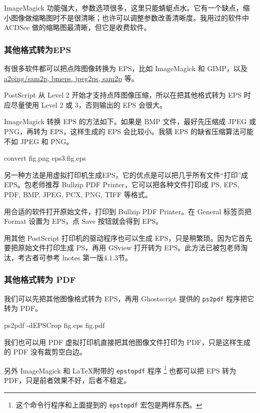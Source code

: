 ImageMagick 功能强大，参数选项很多，这里只能蜻蜓点水。它有一个缺点，缩小图像做缩略图时不是很清晰；也许可以调整参数改善清晰度。我用过的软件中 ACDSee 做的缩略图最清晰，但它是收费软件。

\subsubsection{其他格式转为EPS}

有很多软件都可以把点阵图像转换为 EPS，比如 ImageMagick 和 GIMP，以及 \href{https://texfaq.org/FAQ-dvipsgraphics}{a2ping/sam2p, bmeps, jpeg2ps, sam2p} 等。

PostScript 从 Level 2 开始才支持点阵图像压缩，所以在把其他格式转为 EPS 时应尽量使用 Level 2 或 3，否则输出的 EPS 会很大。

ImageMagick 转换 EPS 的方法如下。如果是 BMP 文件，最好先压缩成 JPEG 或 PNG，再转为 EPS，这样生成的 EPS 会比较小。我猜 EPS 的缺省压缩算法可能不如 JPEG 和 PNG。

\begin{Code}
convert fig.png eps3:fig.eps
\end{Code}

另一种方法是用虚拟打印机生成EPS，它的优点是可以把几乎所有文件“打印”成 EPS。包老师推荐 Bullzip PDF Printer，它可以把各种文件打印成 PS, EPS, PDF, BMP, JPEG, PCX, PNG, TIFF 等格式。

用合适的软件打开原始文件，打印到 Bullzip PDF Printer。在 General 标签页把 Format 设置为 EPS，点 Save 按钮就会得到 EPS。

用其他 PostScript 打印机的驱动程序也可以生成 EPS，只是稍繁琐。因为它首先要把原始文件打印生成 PS，再用 GSview 打开转为 EPS。此方法已被包老师淘汰，考古者可参考 lnotes 第一版\citep{Huang_lnotes}4.1.3节。

\subsubsection{其他格式转为 PDF}

我们可以先把其他图像格式转为 EPS，再用 Ghostscript 提供的 \texttt{ps2pdf} 程序把它转为 PDF。

\begin{Code}
ps2pdf -dEPSCrop fig.eps fig.pdf
\end{Code}

我们也可以用 PDF 虚拟打印机直接把其他图像文件打印为 PDF，只是这样生成的 PDF 没有裁剪空白边。

另外 ImageMagick 和 \LaTeX 附带的 \texttt{epstopdf} 程序 \footnote{这个命令行程序和上面提到的 \texttt{epstopdf} 宏包是两样东西。} 也都可以把 EPS 转为 PDF，只是前者效果不好，后者不稳定。


